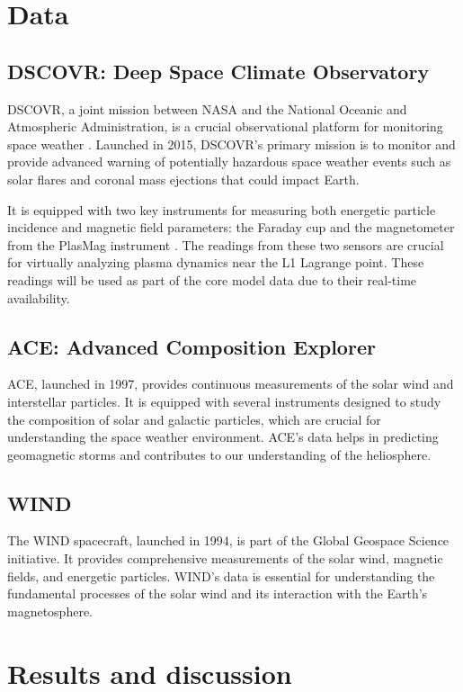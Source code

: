 \documentclass[12pt]{article}
\begin{document}
\section{Data}

\subsection{DSCOVR: Deep Space Climate Observatory}
DSCOVR, a joint mission between NASA and the National Oceanic and Atmospheric Administration, is a crucial observational platform for monitoring space weather \cite{nasa_dscovr}. Launched in 2015, DSCOVR's primary mission is to monitor and provide advanced warning of potentially hazardous space weather events such as solar flares and coronal mass ejections that could impact Earth.

It is equipped with two key instruments for measuring both energetic particle incidence and magnetic field parameters: the Faraday cup and the magnetometer from the PlasMag instrument \cite{nasa_dscovr}. The readings from these two sensors are crucial for virtually analyzing plasma dynamics near the L1 Lagrange point. These readings will be used as part of the core model data due to their real-time availability.

\subsection{ACE: Advanced Composition Explorer}
ACE, launched in 1997, provides continuous measurements of the solar wind and interstellar particles. It is equipped with several instruments designed to study the composition of solar and galactic particles, which are crucial for understanding the space weather environment. ACE's data helps in predicting geomagnetic storms and contributes to our understanding of the heliosphere.

\subsection{WIND}
The WIND spacecraft, launched in 1994, is part of the Global Geospace Science initiative. It provides comprehensive measurements of the solar wind, magnetic fields, and energetic particles. WIND's data is essential for understanding the fundamental processes of the solar wind and its interaction with the Earth's magnetosphere.

\section{Results and discussion}
\end{document}
